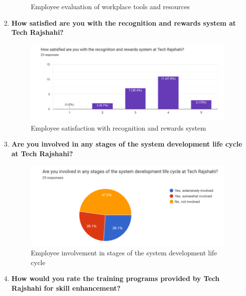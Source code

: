 \documentclass[12pt,a4paper]{article}
\begin{document}
\begin{enumerate}
\begin{figure}[H]
        \caption{Employee evaluation of workplace tools and resources}
        \label{fig:tools_resources}
    \end{figure}
\newpage
    \item \textbf{How satisfied are you with the recognition and rewards system at Tech Rajshahi?}  
    \begin{figure}[H]
        \centering
        \includegraphics[width=\textwidth]{Fig/rs.png}
        \caption{Employee satisfaction with recognition and rewards system}
        \label{fig:recognition_rewards}
    \end{figure}
  \vspace{1cm}
    \item \textbf{Are you involved in any stages of the system development life cycle at Tech Rajshahi?}  
    \begin{figure}[H]
        \centering
        \includegraphics[width=\textwidth]{Fig/sdlc.png}
        \caption{Employee involvement in stages of the system development life cycle}
        \label{fig:sdlc_involvement}
    \end{figure}
\newpage
    \item \textbf{How would you rate the training programs provided by Tech Rajshahi for skill enhancement?}  
    \begin{figure}[H]
        \centering

\end{figure}
\end{enumerate}
\end{document}
